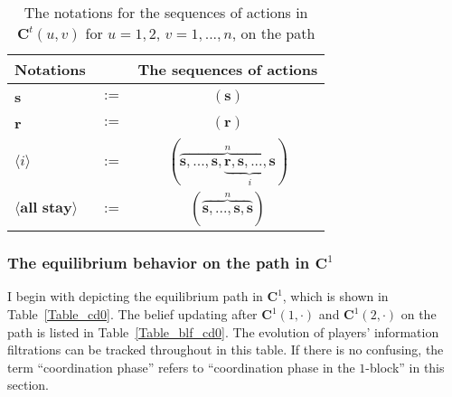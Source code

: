 \documentclass[12pt,letter]{article}
\newcommand{\Kappa}{\mathbf{C}}
\theoremstyle{definition}
\theoremstyle{remark}
\theoremstyle{claim}
\begin{document}
\begin{table}[!htbp]
\caption{The notations for the sequences of actions in $\Kappa^t(u,v)$ for $u=1,2$, $v=1,...,n$, on the path}
\label{Table_msg_coordination}
\begin{center}
\begin{tabular}{l c c}
Notations & &The sequences of actions \\
\hline
\hline
\textbf{s} & $:=$ & $(\textbf{s})$\\
\textbf{r} & $:=$ & $(\textbf{r})$\\
$\langle i \rangle$ 				& $:=$ 			& $(\overbrace{ \textbf{s},...,\textbf{s},\underbrace{\textbf{r},\textbf{s},...,\textbf{s}}_{i}}^{n} )$  \\
$\langle \textbf{all stay} \rangle$	 					& $:=$ 			& $( \overbrace{\textbf{s},...,\textbf{s},{\textbf{s}}}^{n} )$  \\
\hline
\end{tabular}
\end{center}
\end{table}


\subsubsection{The equilibrium behavior on the path in $\Kappa^1$}
\label{sec:cd0}
I begin with depicting the equilibrium path in $\Kappa^1$, which is shown in Table~\ref{Table_cd0}. The belief updating after $\Kappa^1(1,\cdot)$ and $\Kappa^1(2,\cdot)$ on the path is listed in Table~\ref{Table_blf_cd0}. The evolution of players' information filtrations can be tracked throughout in this table. %
If there is no confusing, the term ``coordination phase'' refers to ``coordination phase in the $1$-block'' in this section.
\end{document}
